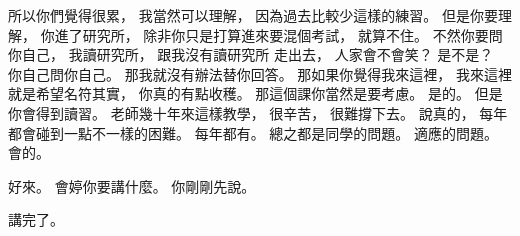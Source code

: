 \hypertarget{w01:cue:3436}{}所以你們覺得很累，
\hypertarget{w01:cue:3437}{}我當然可以理解，
\hypertarget{w01:cue:3438}{}因為過去比較少這樣的練習。
\hypertarget{w01:cue:3439}{}但是你要理解，
\hypertarget{w01:cue:3440}{}你進了研究所，
\hypertarget{w01:cue:3441}{}除非你只是打算進來要混個考試，
\hypertarget{w01:cue:3442}{}就算不住。
\hypertarget{w01:cue:3443}{}不然你要問你自己，
\hypertarget{w01:cue:3444}{}我讀研究所，
\hypertarget{w01:cue:3445}{}跟我沒有讀研究所
\hypertarget{w01:cue:3446}{}走出去，
\hypertarget{w01:cue:3447}{}人家會不會笑？
\hypertarget{w01:cue:3448}{}是不是？
\hypertarget{w01:cue:3449}{}你自己問你自己。
\hypertarget{w01:cue:3450}{}那我就沒有辦法替你回答。
\hypertarget{w01:cue:3451}{}那如果你覺得我來這裡，
\hypertarget{w01:cue:3452}{}我來這裡就是希望名符其實，
\hypertarget{w01:cue:3453}{}你真的有點收穫。
\hypertarget{w01:cue:3454}{}那這個課你當然是要考慮。
\hypertarget{w01:cue:3455}{}是的。
\hypertarget{w01:cue:3456}{}但是你會得到讀習。
\hypertarget{w01:cue:3457}{}老師幾十年來這樣教學，
\hypertarget{w01:cue:3458}{}很辛苦，
\hypertarget{w01:cue:3459}{}很難撐下去。
\hypertarget{w01:cue:3460}{}說真的，
\hypertarget{w01:cue:3461}{}每年都會碰到一點不一樣的困難。
\hypertarget{w01:cue:3462}{}每年都有。
\hypertarget{w01:cue:3463}{}總之都是同學的問題。
\hypertarget{w01:cue:3464}{}適應的問題。
\hypertarget{w01:cue:3465}{}會的。

\hypertarget{w01:cue:3466}{}好來。
\hypertarget{w01:cue:3467}{}會婷你要講什麼。
\hypertarget{w01:cue:3468}{}你剛剛先說。

\hypertarget{w01:cue:3469}{}講完了。

